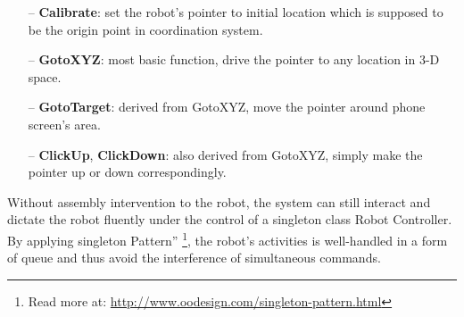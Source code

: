 	\begin{itemize}
		\item[--] \textbf{Calibrate}: set the robot's pointer to initial location which is supposed to be the origin point in coordination system.
		\item[--] \textbf{GotoXYZ}: most basic function, drive the pointer to any location in 3-D space.
		\item[--] \textbf{GotoTarget}: derived from GotoXYZ, move the pointer around phone screen's area.
		\item[--] \textbf{ClickUp}, \textbf{ClickDown}: also derived from GotoXYZ, simply make the pointer up or down correspondingly.
	\end{itemize}

Without assembly intervention to the robot, the system can still interact and dictate the robot fluently under the control of a singleton class Robot Controller. By applying singleton Pattern'' \footnote{Read more at: \url{http://www.oodesign.com/singleton-pattern.html}}, the robot's activities is well-handled in a form of queue and thus avoid the interference of simultaneous commands.